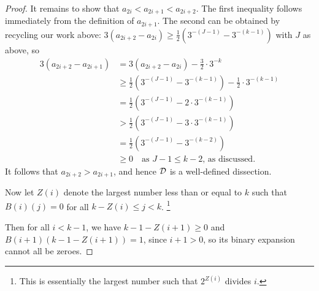 \documentclass[fleqn,a4paper,11pt]{article}
\begin{document}
\begin{proof}
  It remains to show that \(a_{2i} < a_{2i + 1} < a_{2i + 2}\). The first
  inequality follows immediately from the definition of \(a_{2i + 1}\). The
  second can be obtained by recycling our work above:
  \(3(a_{2i + 2} - a_{2i}) \ge \tfrac 12 (3^{-(J - 1)} - 3^{-(k - 1)})\) with
  \(J\) as above, so
  \begin{align*}
   3(a_{2i + 2} - a_{2i + 1})
    &= 3(a_{2i + 2} - a_{2i}) - \tfrac 32 \cdot 3^{-k} \\
    &\ge \tfrac 12 (3^{-(J - 1)}
     - 3^{-(k - 1)}) - \tfrac 12 \cdot 3^{-(k - 1)} \\
    &= \tfrac 12 (3^{-(J - 1)} - 2 \cdot 3^{-(k - 1)}) \\
    &> \tfrac 12 (3^{-(J - 1)} - 3 \cdot 3^{-(k - 1)}) \\
    &= \tfrac 12 (3^{-(J - 1)} - 3^{-(k - 2)}) \\
    &\ge 0 \quad \text{as \(J - 1 \le k - 2\), as discussed.}
  \end{align*}
  It follows that \(a_{2i + 2} > a_{2i + 1}\), and hence \(\mathcal D\) is a
  well-defined dissection.

  Now let \(Z(i)\) denote the largest number less than or equal to \(k\) such
  that \(B(i)(j) = 0\) for all \(k - Z(i) \le j < k\).%
  \footnote{
   This is essentially the largest number such that
   \(2^{Z(i)}\) divides \(i\).
  }

  Then for all \(i < k - 1\), we have \(k - 1 - Z(i + 1) \ge 0\) and
  \(B(i + 1)(k - 1 - Z(i + 1)) = 1\), since \(i + 1 > 0\), so its binary
  expansion cannot all be zeroes.


\end{proof}
\end{document}
